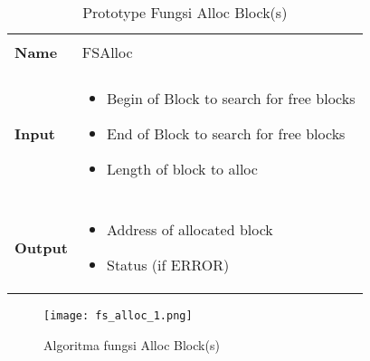 \documentclass[a4paper, 12pt]{report}
\begin{document}
\begin{table}[h]
  \centering
  \begin{tabular}{p{2cm} p{8cm}}
    \hline\\
    {\bf Name} & FSAlloc\\
    \hline\\
    {\bf Input} & 
    \begin{itemize}[noitemsep,topsep=0pt,parsep=0pt,partopsep=0pt]
    \item Begin of Block to search for free blocks
    \item End of Block to search for free blocks
    \item Length of block to alloc
    \end{itemize}
    \\
    \hline\\
    {\bf Output} & 
    \begin{itemize}[noitemsep,topsep=0pt,parsep=0pt,partopsep=0pt]
    \item Address of allocated block
    \item Status (if ERROR)
    \end{itemize}
    \\
    \hline
  \end{tabular}
  \caption{Prototype Fungsi Alloc Block(s)}
  \label{tbl-alloc}
\end{table}



\begin{figure}
\centering
\texttt{[image: fs\_alloc\_1.png]}
\caption{Algoritma fungsi Alloc Block(s)}
\label{fig-alloc-1}
\end{figure}
\end{document}

